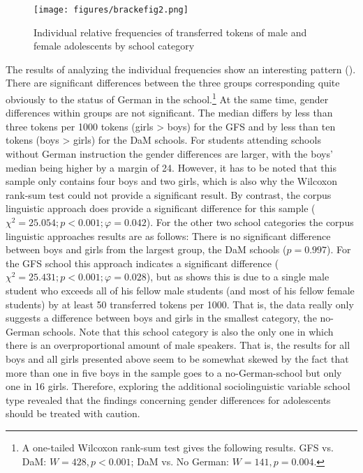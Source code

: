 \documentclass[output=paper]{langsci/langscibook}
\begin{document}
\begin{figure}
\texttt{[image: figures/brackefig2.png]}
 \caption{Individual relative frequencies of transferred tokens of male and female adolescents by school category}
 \label{fig:bracke:2}
 \end{figure}

The results of analyzing the individual frequencies\largerpage{} show an interesting pattern (). There are significant differences between the three groups corresponding quite obviously to the status of German in the school.\footnote{A one-tailed Wilcoxon rank-sum test gives the following results. GFS vs. DaM: $W = 428, p < 0.001$; DaM vs. No German: $W = 141, p = 0.004$.} At the same time, gender differences within groups are not significant. The median differs by less than three tokens per 1000 tokens (girls > boys) for the GFS and by less than ten tokens (boys > girls) for the DaM schools. For students attending schools without German instruction the gender differences are larger, with the boys’ median being higher by a margin of 24. However, it has to be noted that this sample only contains four boys and two girls, which is also why the Wilcoxon rank-sum test could not provide a significant result. By contrast, the corpus linguistic approach does provide a significant difference for this sample ($\chi^2 = 25.054; p < 0.001; \varphi = 0.042$). For the other two school categories the corpus linguistic approaches results are as follows: There is no significant difference between boys and girls from the largest group, the DaM schools ($p = 0.997$). For the GFS school this approach indicates a significant difference ($\chi^2 = 25.431; p < 0.001; \varphi = 0.028$), but as  shows this is due to a single male student who exceeds all of his fellow male students (and most of his fellow female students) by at least 50 transferred tokens per 1000. That is, the data really only suggests a difference between boys and girls in the smallest category, the no-German schools. Note that this school category is also the only one in which there is an overproportional amount of male speakers. That is, the results for all boys and all girls presented above seem to be somewhat skewed by the fact that more than one in five boys in the sample goes to a no-German-school but only one in 16 girls. Therefore, exploring the additional sociolinguistic variable school type revealed that the findings concerning gender differences for adolescents should be treated with caution.
  
\end{document}
